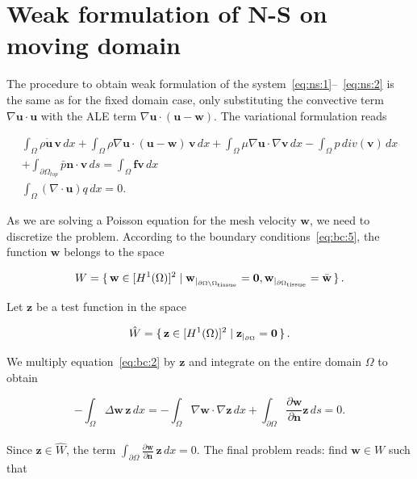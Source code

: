 \documentclass[a4paper,11pt,openright,twoside]{book}
\begin{document}
\section{Weak formulation of N-S on moving domain}
The procedure to obtain weak formulation of the system~\eqref{eq:ns:1}--~\eqref{eq:ns:2} is the same as for the fixed domain case, only substituting the convective term $\nabla \mathbf{u} \cdot \mathbf{u}$ with the ALE term $\nabla \mathbf{u} \cdot \mathbf{(u - w)}$. The variational formulation reads

\begin{equation}
\label{eq:ns:5}
\begin{split}
\int_{\Omega} \rho \dot{\mathbf{u}} \, \mathbf{v} \, dx
+ \int_{\Omega} \rho \nabla \mathbf{u} \cdot (\mathbf{u} - \mathbf{w}) \, \mathbf{v} \, dx
+ \int_{\Omega} \mu \nabla \mathbf{u} \cdot \nabla \mathbf{v} \, dx 
- \int_{\Omega} p \, div(\mathbf{v}) \, dx \\
+ \int_{\partial \Omega_{top}} \bar{p} \mathbf{n} \cdot \mathbf{v} \, ds
 =  \int_{\Omega} \mathbf{f} \mathbf{v} \, dx \\
\int_{\Omega}  (\nabla \cdot \mathbf{u}) q \, dx = 0.
\end{split}
\end{equation}


As we are solving a Poisson equation for the mesh velocity $\mathbf{w}$, we need to discretize the problem. According to the boundary conditions~\eqref{eq:bc:5}, the function $\mathbf{w}$ belongs to the space

\begin{equation}
W = \set{\mathbf{w} \in [H^1(\Omega)]^2 | \mathbf{w}_{|_{\partial \Omega \setminus \Omega_{\rm tissue}}} = \mathbf{0}, \mathbf{w}_{|_{\partial \Omega_{\rm tissue} } }  = \bar{\mathbf{w}} }.
\end{equation}

Let $\mathbf{z}$ be a test function in the space

\begin{equation}
\hat{W} = \set{\mathbf{z} \in [H^1(\Omega)]^2 | \mathbf{z}_{|_{\partial \Omega}} = \mathbf{0}}.
\end{equation}


We multiply equation~\eqref{eq:bc:2} by $\mathbf{z}$ and integrate on the entire domain $\Omega$ to obtain

\begin{equation}
\label{eq:bc:4}
- \int_{\Omega} \Delta \mathbf{w} \, \mathbf{z} \, dx
= - \int_{\Omega} \nabla \mathbf{w} \cdot \nabla \mathbf{z} \, dx
+ \int_{\partial \Omega} \frac{\partial \mathbf{w}}{\partial \mathbf{n}} \mathbf{z} \, ds = 0.
\end{equation}
\\
Since $\mathbf{z} \in \hat{W}$, the term $\int_{\partial \Omega} \frac{\partial \mathbf{w}}{\partial \mathbf{n}} \, \mathbf{z} \, dx  = 0$. The final problem reads: find $\mathbf{w} \in W$ such that
\end{document}
